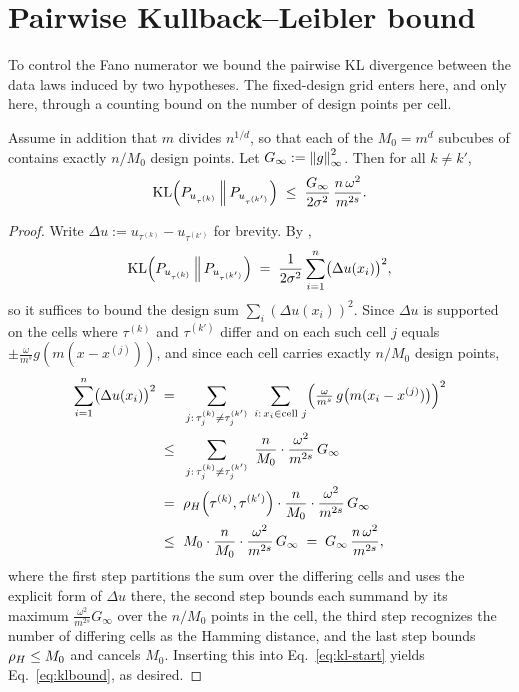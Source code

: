 \section{Pairwise Kullback--Leibler bound}\label{sec:kl}

To control the Fano numerator we bound the pairwise KL divergence between the
data laws induced by two hypotheses. The fixed-design grid enters here, and
only here, through a counting bound on the number of design points per cell.

\begin{lemma}\label{lem:kl}
Assume in addition that $m$ divides $n^{1/d}$, so that each of the $M_0=m^d$
subcubes of  contains exactly $n/M_0$ design points. Let
$G_\infty := \left\| g \right\|_{\infty}^2$. Then for all $k\ne k'$,
\begin{align}\label{eq:klbound}
\mathrm{KL}\!\left(P_{u_{\tau^{(k)}}}\,\middle\|\,P_{u_{\tau^{(k')}}}\right)
\;\le\; \frac{G_\infty}{2\sigma^2}\,\frac{n\,\omega^2}{m^{2s}}.
\end{align}
\end{lemma}

\begin{proof}
Write $\Delta u := u_{\tau^{(k)}}-u_{\tau^{(k')}}$ for brevity. By
,
\begin{align}\label{eq:kl-start}
\mathrm{KL}\!\left(P_{u_{\tau^{(k)}}}\,\middle\|\,P_{u_{\tau^{(k')}}}\right)
\;=\; \frac{1}{2\sigma^2}\sum_{i=1}^{n}\bigl(\Delta u(x_i)\bigr)^2,
\end{align}
so it suffices to bound the design sum $\sum_i (\Delta u(x_i))^2$. Since
$\Delta u$ is supported on the cells where $\tau^{(k)}$ and $\tau^{(k')}$
differ and on each such cell $j$ equals $\pm\tfrac{\omega}{m^{s}}g(m(x-x^{(j)}))$,
and since each cell carries exactly $n/M_0$ design points,
\begin{align*}
\sum_{i=1}^{n}\bigl(\Delta u(x_i)\bigr)^2
\;=\; & ~ \sum_{j:\,\tau^{(k)}_j\ne\tau^{(k')}_j}\;\sum_{i:\,x_i\in\text{cell }j}
        \Bigl(\tfrac{\omega}{m^{s}}\,g\bigl(m(x_i-x^{(j)})\bigr)\Bigr)^2 \\
\;\le\; & ~ \sum_{j:\,\tau^{(k)}_j\ne\tau^{(k')}_j}\;\frac{n}{M_0}\cdot\frac{\omega^2}{m^{2s}}\,G_\infty \\
\;=\; & ~ \rho_{H}\!\left(\tau^{(k)},\tau^{(k')}\right)\cdot\frac{n}{M_0}\cdot\frac{\omega^2}{m^{2s}}\,G_\infty \\
\;\le\; & ~ M_0\cdot\frac{n}{M_0}\cdot\frac{\omega^2}{m^{2s}}\,G_\infty
\;=\; G_\infty\,\frac{n\,\omega^2}{m^{2s}},
\end{align*}
where the first step partitions the sum over the differing cells and uses the
explicit form of $\Delta u$ there, the second step bounds each summand by its
maximum $\tfrac{\omega^2}{m^{2s}}G_\infty$ over the $n/M_0$ points in the cell,
the third step recognizes the number of differing cells as the Hamming
distance, and the last step bounds $\rho_{H}\le M_0$ and cancels $M_0$. Inserting
this into Eq.~\eqref{eq:kl-start} yields Eq.~\eqref{eq:klbound}, as desired.
\end{proof}
